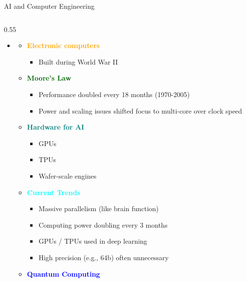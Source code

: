 \documentclass[
  10pt,
  ignorenonframetext,
]{beamer}
\providecommand{\tightlist}{%
  \setlength{\itemsep}{0pt}\setlength{\parskip}{0pt}}
\begin{document}
\begin{frame}{AI and Computer Engineering}
\label{ai-and-computer-engineering}
\begin{columns}[T]
\begin{column}{0.55\textwidth}
\begin{itemize}
\tightlist
\item
  \textbf{\textcolor{red}{\textcolor{black}{}}}

  \begin{itemize}
  \tightlist
  \item
    \textbf{\textcolor{orange}{Electronic computers}}

    \begin{itemize}
    \tightlist
    \item
      Built during World War II
    \end{itemize}
  \item
    \textbf{\textcolor{darkgreen}{Moore's Law}}

    \begin{itemize}
    \tightlist
    \item
      Performance doubled every 18 months (1970-2005)
    \item
      Power and scaling issues shifted focus to multi-core over clock
      speed
    \end{itemize}
  \item
    \textbf{\textcolor{teal}{Hardware for AI}}

    \begin{itemize}
    \tightlist
    \item
      GPUs
    \item
      TPUs
    \item
      Wafer-scale engines
    \end{itemize}
  \item
    \textbf{\textcolor{cyan}{Current Trends}}

    \begin{itemize}
    \tightlist
    \item
      Massive parallelism (like brain function)
    \item
      Computing power doubling every 3 months
    \item
      GPUs / TPUs used in deep learning
    \item
      High precision (e.g., 64b) often unnecessary
    \end{itemize}
  \item
    \textbf{\textcolor{blue}{Quantum Computing}}


\end{itemize}
\end{itemize}
\end{column}
\end{columns}
\end{frame}
\end{document}
